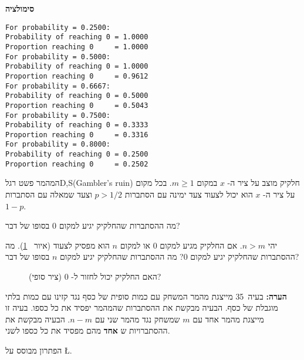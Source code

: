 \textbf{סימולציה}
\begin{verbatim}
For probability = 0.2500:
Probability of reaching 0 = 1.0000
Proportion reaching 0     = 1.0000
For probability = 0.5000:
Probability of reaching 0 = 1.0000
Proportion reaching 0     = 0.9612
For probability = 0.6667:
Probability of reaching 0 = 0.5000
Proportion reaching 0     = 0.5043
For probability = 0.7500:
Probability of reaching 0 = 0.3333
Proportion reaching 0     = 0.3316
For probability = 0.8000:
Probability of reaching 0 = 0.2500
Proportion reaching 0     = 0.2502
\end{verbatim}


\begin{prob}{המהמר פשט רגל}{D,S}{(Gambler's ruin)}
חלקיק מוצב על ציר ה-%
$x$
במקום
$m\geq 1$.
בכל מקום על ציר ה-%
$x$
הוא יכול לצעוד צעד ימינה עם הסתברות
$p>1/2$
וצעד שמאלה עם הסתברות
$1-p$.

מה ההסתברות שהחלקיק יגיע למקום
$0$
בסופו של דבר?

 יהי 
$n>m$.
אם החלקיק מגיע למקום 
$0$
או למקום
$n$
הוא מפסיק לצעוד (איור%
~\ref{f.ruin3}).
מה ההסתברות שהחלקיק יגיע למקום 
$0$?
מה ההסתברות שהחלקיק יגיע למקום
$n$
בסופו של דבר?
\begin{figure}[tb]
\begin{center}
\end{center}
\caption{האם החלקיק יכול לחזור ל-%
$0$ (ציר סופי)?}
\label{f.ruin3}
\end{figure}

\textbf{הערה:} 
בעיה~35 מייצגת מהמר המשחק עם כמות סופית של כסף נגד קזינו עם כמות בלתי מוגבלת של כסף. הבעיה מבקשת את ההסתברות שהמהמר יפסיד את כל כספו. בעיה זו מייצגת מהמר אחד עם 
$m$
שמשחק נגד מהמר שני עם 
$n-m$.
הבעיה מבקשת את ההסתברויות ש%
\textbf{אחד}
מהם מפסיד את כל כספו לשני.
\end{prob}

\solution{}

הפתרון מבוסס על
\L{\cite[Chapter~2, Example~4m]{ross}}.

